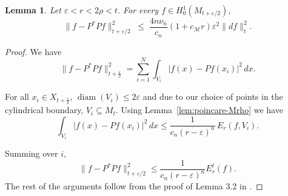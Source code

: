 \documentclass[10 pt, reqno]{amsart}
\newtheorem{lemma}[theorem]{Lemma}
\theoremstyle{definition}
\numberwithin{equation}{section}
\newcommand{\MMM}{\mathcal{M}}
\begin{document}
\begin{lemma}\label{lem:approx-PstarP-Mrho}
Let $\varepsilon < r < 2\rho<t.$  For every $f\in H^1_0(M_{t+\varepsilon/2})$,
\[
\|f-P^*Pf\|_{{t+\varepsilon/2}}^2
\;\le\;
\frac{4n\nu_{n}}{c_n }(1+c_\MMM r)\varepsilon^2\|d f\|_{t}^2.
\]

\end{lemma}
\begin{proof}
We have
\[
\|f-P^*Pf\|_{t+\frac{\varepsilon}{2}}^2
=
\sum_{i=1}^N
\int_{V_i}
|f(x)-Pf(x_i)|^2\,dx.
\]


For all $x_i\in X_{t+\frac{\varepsilon}{2}}$, $\operatorname{diam}(V_i)\le 2\varepsilon$ and due to our choice of points in the cylindrical boundary, $V_i\subseteq  M_{t}$. Using Lemma~\ref{lem:poincare-Mrho} we have
\[
\int_{V_i}
|f(x)-Pf(x_i)|^2\,dx
\le
\frac{1}{c_n(r-\varepsilon)^n}\,
E_r(f,V_i).
\]


Summing over $i$,
\[
\|f-P^*Pf\|_{{t+\varepsilon/2}}^2
\le
\frac{1}{c_n(r-\varepsilon)^n}
E_r^{t}(f).
\]
The rest of the arguments follow from the proof of Lemma 3.2 in \cite{MaityBhattacharya2026}.
\end{proof}
\end{document}
